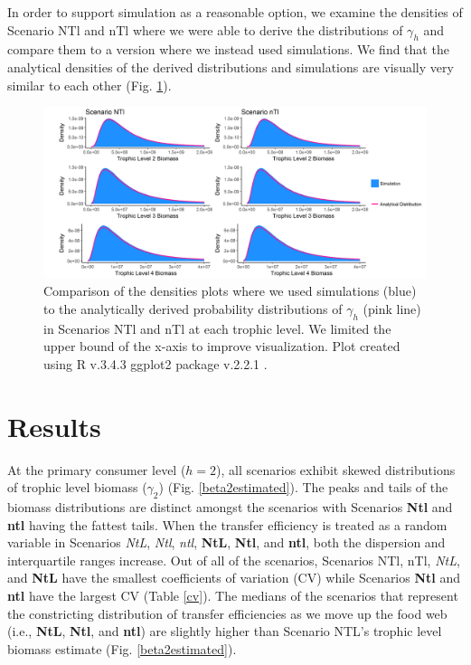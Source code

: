 \documentclass[oneside,12pt,final]{sty/ucthesis-CA2012}
\let\cite\citep                             %
\begin{document}
\begin{mainmatter}
\vspace{5mm}

In order to support simulation as a reasonable option, we examine the densities of Scenario NTl and nTl where we were able to derive the distributions of $\gamma_h$ and compare them to a version where we instead used simulations. We find that the analytical densities of the derived distributions and simulations are visually very similar to each other (Fig. \ref{scen1and4distsim}). 

\begin{figure}[H]
     \centering
       \includegraphics[width=\textwidth]{fig/scen4and7distsim}
    \caption{Comparison of the densities plots where we used simulations (blue) to the analytically derived probability distributions of $\gamma_h$ (pink line) in Scenarios NTl and nTl at each trophic level. We limited the upper bound of the x-axis to improve visualization. Plot created using R v.3.4.3 \cite{Rcite} ggplot2 package v.2.2.1 \cite{ggplot}. }
    \label{scen1and4distsim}
\end{figure}


\section*{Results}
At the primary consumer level ($h=2$), all scenarios exhibit skewed distributions of trophic level biomass ($\gamma_2$) (Fig. \ref{beta2estimated}). The peaks and tails of the biomass distributions are distinct amongst the scenarios with Scenarios \textbf{Ntl} and \textbf{ntl} having the fattest tails. When the transfer efficiency is treated as a random variable in Scenarios \textit{NtL}, \textit{Ntl}, \textit{ntl}, \textbf{NtL}, \textbf{Ntl}, and \textbf{ntl}, both the dispersion and interquartile ranges increase. Out of all of the scenarios, Scenarios NTl, nTl, \textit{NtL}, and \textbf{NtL} have the smallest coefficients of variation (CV) while Scenarios \textbf{Ntl} and \textbf{ntl} have the largest CV (Table \ref{cv}). The medians of the scenarios that represent the constricting distribution of transfer efficiencies as we move up the food web (i.e., \textbf{NtL}, \textbf{Ntl}, and \textbf{ntl}) are slightly higher than Scenario NTL's trophic level biomass estimate (Fig. \ref{beta2estimated}).   


\end{mainmatter}
\end{document}
